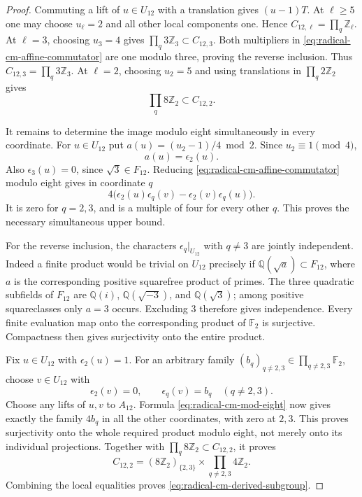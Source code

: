 \begin{proof}
Commuting a lift of $u\in U_{12}$ with a translation gives
$(u-1)T$.  At $\ell\geq5$ one may choose $u_\ell=2$ and all
other local components one.  Hence
$C_{12,\ell}=\prod_q\mathbb Z_\ell$.
At $\ell=3$, choosing $u_3=4$ gives
$\prod_q3\mathbb Z_3\subset C_{12,3}$.
Both multipliers in \eqref{eq:radical-cm-affine-commutator} are one
modulo three, proving the reverse inclusion.  Thus
$C_{12,3}=\prod_q3\mathbb Z_3$.
At $\ell=2$, choosing $u_2=5$ and using translations in
$\prod_q2\mathbb Z_2$ gives
\[
 \prod_q8\mathbb Z_2\subset C_{12,2}.
\]

It remains to determine the image modulo eight simultaneously
in every coordinate.  For $u\in U_{12}$ put
$a(u)=(u_2-1)/4\bmod2$.  Since $u_2\equiv1\pmod4$,
\[
 a(u)=\epsilon_2(u).
\]
Also $\epsilon_3(u)=0$, since $\sqrt3\in F_{12}$.
Reducing \eqref{eq:radical-cm-affine-commutator} modulo eight gives
in coordinate $q$
\begin{equation}
 4\bigl(\epsilon_2(u)\epsilon_q(v)
               -\epsilon_2(v)\epsilon_q(u)\bigr).
 \label{eq:radical-cm-mod-eight}
\end{equation}
It is zero for $q=2,3$, and is a multiple of four for every
other $q$.  This proves the necessary simultaneous upper bound.

For the reverse inclusion, the characters
$\epsilon_q|_{U_{12}}$ with $q\ne3$ are jointly independent.
Indeed a finite product would be trivial on $U_{12}$ precisely if
$\mathbb Q(\sqrt a)\subset F_{12}$, where $a$ is the corresponding
positive squarefree product of primes.  The three quadratic
subfields of $F_{12}$ are
$\mathbb Q(i)$, $\mathbb Q(\sqrt{-3})$, and $\mathbb Q(\sqrt3)$;
among positive squareclasses only $a=3$ occurs.  Excluding $3$
therefore gives independence.  Every finite evaluation map onto
the corresponding product of $\mathbb F_2$ is surjective.
Compactness then gives surjectivity onto the entire product.

Fix $u\in U_{12}$ with $\epsilon_2(u)=1$.  For an arbitrary family
$(b_q)_{q\ne2,3}\in\prod_{q\ne2,3}\mathbb F_2$, choose
$v\in U_{12}$ with
\[
 \epsilon_2(v)=0,\qquad \epsilon_q(v)=b_q\quad(q\ne2,3).
\]
Choose any lifts of $u,v$ to $A_{12}$.  Formula
\eqref{eq:radical-cm-mod-eight} now gives exactly the family
$4b_q$ in all the other coordinates, with zero at $2,3$.
This proves surjectivity onto the whole required product modulo
eight, not merely onto its individual projections.  Together
with $\prod_q8\mathbb Z_2\subset C_{12,2}$, it proves
\[
 C_{12,2}=(8\mathbb Z_2)_{\{2,3\}}\times
                       \prod_{q\ne2,3}4\mathbb Z_2.
\]
Combining the local equalities proves
\eqref{eq:radical-cm-derived-subgroup}.


\end{proof}
